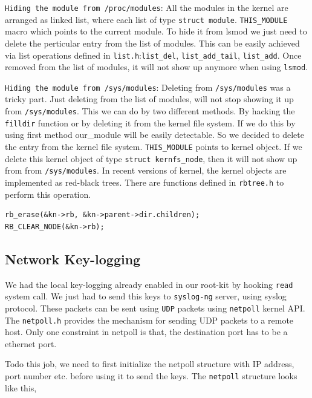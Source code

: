 \documentclass[10pt, letterpaper]{scrartcl}
\begin{document}
\texttt{Hiding the module from /proc/modules}: All the modules in the kernel are arranged as linked list, 
where each list of type \texttt{struct module}. \texttt{THIS\_MODULE} macro which points to the current module. 
To hide it from lsmod we just need to delete the perticular entry from the list of modules. 
This can be easily achieved via list operations defined in \texttt{list.h}:\texttt{list\_del}, 
\texttt{list\_add\_tail}, \texttt{list\_add}. Once removed from the list of modules, 
it will not show up anymore when using \texttt{lsmod}. 

\texttt{Hiding the module from /sys/modules}: Deleting from \texttt{/sys/modules} was a tricky part. 
Just deleting from the list of modules, will not stop showing it up from \texttt{/sys/modules}.
This we can do by two different methods. By hacking the \texttt{filldir} function or by deleting it from the 
kernel file system. If we do this by using first method our\_module will be easily detectable. 
So we decided to delete the entry from the kernel file system. \texttt{THIS\_MODULE} points to kernel object. 
If we delete this kernel object of type \texttt{struct kernfs\_node}, then it will not show up from from \texttt{/sys/modules}. 
In recent versions of kernel, the kernel objects are implemented as red-black trees. 
There are functions defined in \texttt{rbtree.h} to perform this operation. 

\begin{verbatim}
rb_erase(&kn->rb, &kn->parent->dir.children);
RB_CLEAR_NODE(&kn->rb);
\end{verbatim}


\subsection{Network Key-logging}
We had the local key-logging already enabled in our root-kit by hooking \texttt{read} system call. 
We just had to send this keys to \texttt{syslog-ng} server, using syslog protocol. 
These packets can be sent using \texttt{UDP} packets using \texttt{netpoll} kernel API. 
The \texttt{netpoll.h} provides the mechanism for sending UDP packets to a remote host. 
Only one constraint in netpoll is that, the destination port has to be a ethernet port. 

Todo this job, we need to first initialize the netpoll structure with IP address, port number etc. 
before using it to send the keys. 
The \texttt{netpoll} structure looks like this, 
\end{document}

